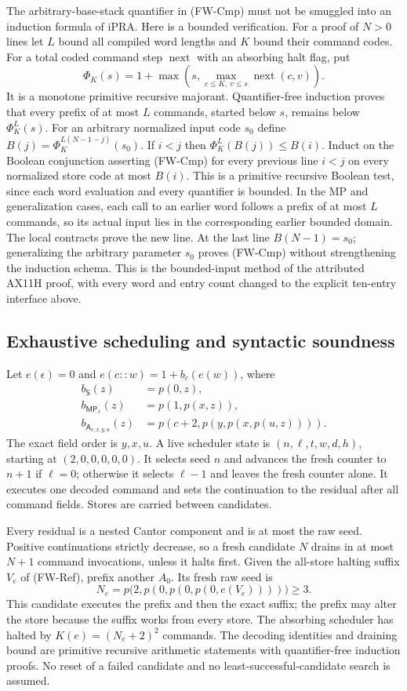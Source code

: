 The arbitrary-base-stack quantifier in (FW-Cmp) must not be smuggled into
an induction formula of iPRA.  Here is a bounded verification.  For a
proof of $N>0$ lines let $L$ bound all compiled word lengths and $K$ bound
their command codes.  For a total coded command step $\operatorname{next}$
with an absorbing halt flag, put
\[
 \Phi_K(s)=1+\max\left(s,
       \max_{c\le K,\ v\le s}\operatorname{next}(c,v)\right).
\]
It is a monotone primitive recursive majorant.  Quantifier-free induction
proves that every prefix of at most $L$ commands, started below $s$,
remains below $\Phi_K^L(s)$.  For an arbitrary normalized input code
$s_0$ define $B(j)=\Phi_K^{L(N-1-j)}(s_0)$.  If $i<j$ then
$\Phi_K^L(B(j))\le B(i)$.  Induct on the Boolean conjunction asserting
(FW-Cmp) for every previous line $i<j$ on every normalized store code
at most $B(i)$.  This is a primitive recursive Boolean test, since each
word evaluation and every quantifier is bounded.  In the MP and
generalization cases, each call to an earlier word follows a prefix of
at most $L$ commands, so its actual input lies in the corresponding
earlier bounded domain.  The local contracts prove the new line.  At
the last line $B(N-1)=s_0$; generalizing the arbitrary parameter $s_0$
proves (FW-Cmp) without strengthening the induction schema.  This is the
bounded-input method of the attributed AX11H proof, with every word and
entry count changed to the explicit ten-entry interface above.

\subsection{Exhaustive scheduling and syntactic soundness}

Let $e(\epsilon)=0$ and $e(c::w)=1+b_c(e(w))$, where
\begin{align*}
 b_{\mathsf S}(z)&=p(0,z),\\
 b_{\mathsf{MP}_x}(z)&=p(1,p(x,z)),\\
 b_{\mathsf A_{c,x,y,u}}(z)&=p(c+2,p(y,p(x,p(u,z)))).      \tag{FW-Code}
\end{align*}
The exact field order is $y,x,u$.  A live scheduler state is
$(n,\ell,t,w,d,h)$, starting at $(2,0,0,0,0,0)$.  It selects seed $n$
and advances the fresh counter to $n+1$ if $\ell=0$; otherwise it selects
$\ell-1$ and leaves the fresh counter alone.  It executes one decoded
command and sets the continuation to the residual after all command
fields.  Stores are carried between candidates.

Every residual is a nested Cantor component and is at most the raw seed.
Positive continuations strictly decrease, so a fresh candidate $N$ drains
in at most $N+1$ command invocations, unless it halts first.  Given the
all-store halting suffix $V_e$ of (FW-Ref), prefix another $A_0$.
Its fresh raw seed is
\[
 N_e=p\bigl(2,p(0,p(0,p(0,e(V_e))))\bigr)\ge3.
\]
This candidate executes the prefix and then the exact suffix; the prefix
may alter the store because the suffix works from every store.  The
absorbing scheduler has halted by $K(e)=(N_e+2)^2$ commands.  The
decoding identities and draining bound are primitive recursive arithmetic
statements with quantifier-free induction proofs.  No reset of a failed
candidate and no least-successful-candidate search is assumed.

